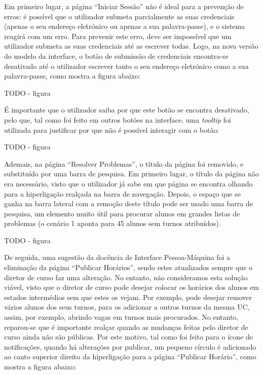 \documentclass[12pt, a4paper]{article}
\begin{document}
Em primeiro lugar, a página ``Iniciar Sessão'' não é ideal para a prevenção de erros: é possível que
o utilizador submeta parcialmente as suas credenciais (apenas o seu endereço eletrónico ou apenas a
sua palavra-passe), e o sistema reagirá com um erro. Para prevenir este erro, deve ser impossível
que um utilizador submeta as suas credenciais até as escrever todas. Logo, na nova versão do modelo
da interface, o botão de submissão de credenciais encontra-se desativado até o utilizador escrever
tanto o seu endereço eletrónico como a sua palavra-passe, como mostra a figura abaixo:

{\color{red} TODO - figura}

É importante que o utilizador saiba por que este botão se encontra desativado, pelo que, tal como
foi feito em outros botões na interface, uma \emph{tooltip} foi utilizada para justificar por que
não é possível interagir com o botão:

{\color{red} TODO - figura}

Ademais, na página ``Resolver Problemas'', o título da página foi removido, e substituído por uma
barra de pesquisa. Em primeiro lugar, o título da página não era necessário, visto que o utilizador
já sabe em que página se encontra olhando para a hiperligação realçada na barra de navegação.
Depois, o espaço que se ganha na barra lateral com a remoção deste título pode ser usado uma barra
de pesquisa, um elemento muito útil para procurar alunos em grandes listas de problemas (o cenário 1
aponta para 45 alunos sem turnos atribuídos).

{\color{red} TODO - figura}

De seguida, uma sugestão da docência de Interface Pessoa-Máquina foi a eliminação da página
``Publicar Horários'', sendo estes atualizados sempre que o diretor de curso faz uma alteração. No
entanto, não consideramos esta solução viável, visto que o diretor de curso pode desejar colocar os
horários dos alunos em estados intermédios sem que estes os vejam. Por exemplo, pode desejar remover
vários alunos dos seus turnos, para os adicionar a outros turnos da mesma UC, assim, por exemplo,
abrindo vagas em turnos mais procurados. No entanto, reparou-se que é importante realçar quando as
mudanças feitas pelo diretor de curso ainda não são públicas. Por este motivo, tal como foi feito
para o ícone de notificações, quando há alterações por publicar, um pequeno círculo é adicionado ao
canto superior direito da hiperligação para a página ``Publicar Horário'', como mostra a figura
abaixo:
\end{document}
